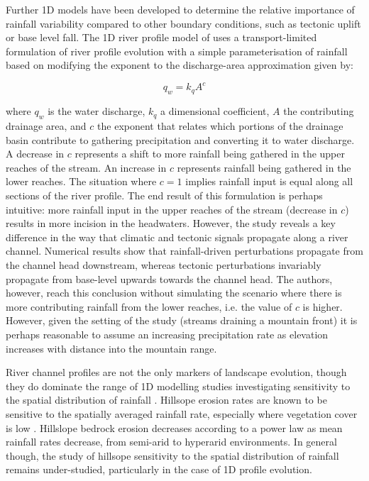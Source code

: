 Further 1D models have been developed to determine the relative importance of rainfall variability compared to other boundary conditions, such as tectonic uplift or base level fall. The 1D river profile model of \citet{Wobus2010} uses a transport-limited formulation of river profile evolution \citep{meyer1948formulas} with a simple parameterisation of rainfall based on modifying the exponent to the discharge-area approximation given by:

\begin{equation}
q_w = k_qA^c
\end{equation}

\noindent
where \(q_w\) is the water discharge, \(k_q\) a dimensional coefficient, \(A\) the contributing drainage area, and \(c\) the exponent that relates which portions of the drainage basin contribute to gathering precipitation and converting it to water discharge. A decrease in \(c\) represents a shift to more rainfall being gathered in the upper reaches of the stream. An increase in \(c\) represents rainfall being gathered in the lower reaches. The situation where \(c = 1\) implies rainfall input is equal along all sections of the river profile. The end result of this formulation is perhaps intuitive: more rainfall input in the upper reaches of the stream (decrease in \(c\)) results in more incision in the headwaters. However, the study reveals a key difference in the way that climatic and tectonic signals propagate along a river channel. Numerical results show that rainfall-driven perturbations propagate from the channel head downstream, whereas tectonic perturbations invariably propagate from base-level upwards towards the channel head. The authors, however, reach this conclusion without simulating the scenario where there is more contributing rainfall from the lower reaches, i.e. the value of \(c\) is higher. However, given the setting of the study (streams draining a mountain front) it is perhaps reasonable to assume an increasing precipitation rate as elevation increases with distance into the mountain range.

River channel profiles are not the only markers of landscape evolution, though they do dominate the range of 1D modelling studies investigating sensitivity to the spatial distribution of rainfall \citep{Tucker2010}. Hillsope erosion rates are known to be sensitive to the spatially averaged rainfall rate, especially where vegetation cover is low \citep{Owen2011}. Hillslope bedrock erosion decreases according to a power law as mean rainfall rates decrease, from semi-arid to hyperarid environments. In general though, the study of hillsope sensitivity to the spatial distribution of rainfall remains under-studied, particularly in the case of 1D profile evolution.

